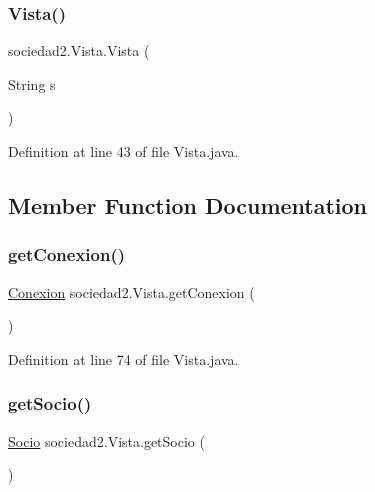 \subsubsection{\texorpdfstring{Vista()}{Vista()}}
{\footnotesize\ttfamily sociedad2.\+Vista.\+Vista (\begin{DoxyParamCaption}\item[{String}]{s }\end{DoxyParamCaption})}



Definition at line 43 of file Vista.\+java.



\subsection{Member Function Documentation}
\mbox{\label{classsociedad2_1_1_vista_a9d018d249c3888a62f7ba905cfb50d3a}} 
\subsubsection{\texorpdfstring{get\+Conexion()}{getConexion()}}
{\footnotesize\ttfamily \mbox{\hyperlink{classsociedad2_1_1_conexion}{Conexion}} sociedad2.\+Vista.\+get\+Conexion (\begin{DoxyParamCaption}{ }\end{DoxyParamCaption})}



Definition at line 74 of file Vista.\+java.

\mbox{\label{classsociedad2_1_1_vista_abb81b93cc2a77eec1a011a6b66d2097e}} 
\subsubsection{\texorpdfstring{get\+Socio()}{getSocio()}}
{\footnotesize\ttfamily \mbox{\hyperlink{classsociedad2_1_1_socio}{Socio}} sociedad2.\+Vista.\+get\+Socio (\begin{DoxyParamCaption}{ }\end{DoxyParamCaption})}



